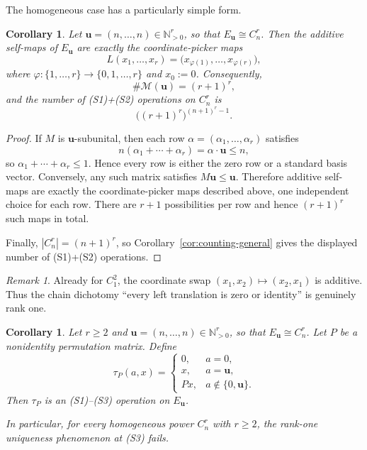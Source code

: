 \documentclass[11pt]{article}
\newtheorem{corollary}[theorem]{Corollary}
\theoremstyle{definition}
\theoremstyle{remark}
\newtheorem{remark}[theorem]{Remark}
\numberwithin{equation}{section}
\newcommand{\NN}{\mathbb{N}}
\begin{document}
The homogeneous case has a particularly simple form.

\begin{corollary}\label{cor:homogeneous-power}
Let $\mathbf u=(n,\dots,n)\in\NN_{>0}^r$, so that $E_{\mathbf u}\cong C_n^r$. Then the additive self-maps of $E_{\mathbf u}$ are exactly the coordinate-picker maps
\[
L(x_1,\dots,x_r)=\bigl(x_{\varphi(1)},\dots,x_{\varphi(r)}\bigr),
\]
where $\varphi\colon\{1,\dots,r\}\to\{0,1,\dots,r\}$ and $x_0:=0$. Consequently,
\[
\#\mathcal M(\mathbf u)=(r+1)^r,
\]
and the number of \textup{(S1)}+\textup{(S2)} operations on $C_n^r$ is
\[
\bigl((r+1)^r\bigr)^{(n+1)^r-1}.
\]
\end{corollary}

\begin{proof}
If $M$ is $\mathbf u$-subunital, then each row $\alpha=(\alpha_1,\dots,\alpha_r)$ satisfies
\[
n(\alpha_1+\cdots+\alpha_r)=\alpha\cdot \mathbf u\le n,
\]
so $\alpha_1+\cdots+\alpha_r\le 1$. Hence every row is either the zero row or a standard basis vector. Conversely, any such matrix satisfies $M\mathbf u\le \mathbf u$. Therefore additive self-maps are exactly the coordinate-picker maps described above, one independent choice for each row. There are $r+1$ possibilities per row and hence $(r+1)^r$ such maps in total.

Finally, $|C_n^r|=(n+1)^r$, so Corollary~\ref{cor:counting-general} gives the displayed number of \textup{(S1)}+\textup{(S2)} operations.
\end{proof}

\begin{remark}
Already for $C_1^2$, the coordinate swap $(x_1,x_2)\mapsto(x_2,x_1)$ is additive. Thus the chain dichotomy ``every left translation is zero or identity'' is genuinely rank one.
\end{remark}

\begin{corollary}\label{cor:homogeneous-flexibility}
Let $r\ge 2$ and $\mathbf u=(n,\dots,n)\in\NN_{>0}^r$, so that $E_{\mathbf u}\cong C_n^r$. Let $P$ be a nonidentity permutation matrix. Define
\[
\tau_P(a,x)=
\begin{cases}
0,& a=0,\\
x,& a=\mathbf u,\\
Px,& a\notin\{0,\mathbf u\}.
\end{cases}
\]
Then $\tau_P$ is an \textup{(S1)}--\textup{(S3)} operation on $E_{\mathbf u}$.

In particular, for every homogeneous power $C_n^r$ with $r\ge 2$, the rank-one uniqueness phenomenon at \textup{(S3)} fails.
\end{corollary}
\end{document}

